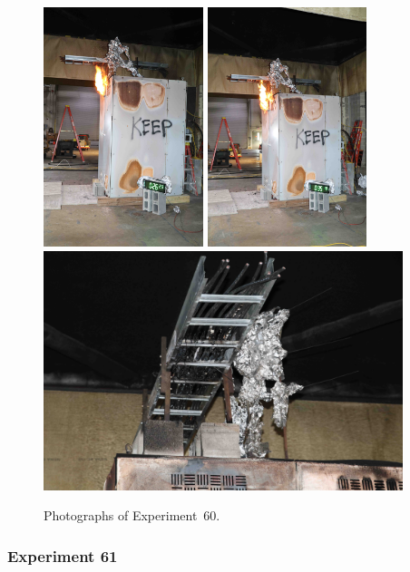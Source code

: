 \begin{figure}[p]
\centering
\includegraphics[height=2.75in,angle=-90]{../FIGURES/Test_60_26_min_23_s}
\includegraphics[height=2.75in,angle=-90]{../FIGURES/Test_60_35_min_18_s} \\
\includegraphics[height=2.75in]{../FIGURES/Test_60_scar}
\caption[Photographs of Experiment~60]{Photographs of Experiment~60.}
\label{fig:Test_60_photos}
\end{figure}


\clearpage

\subsubsection{Experiment 61}

